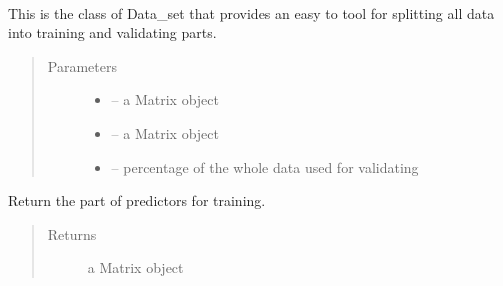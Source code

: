 \documentclass[letterpaper,10pt,english]{sphinxmanual}
\begin{document}
\begin{fulllineitems}
\label{\detokenize{index:dbm_py.interface.Data_set}}~

\begin{fulllineitems}
\label{\detokenize{index:dbm_py.interface.Data_set.__init__}}
This is the class of Data\_set that provides an easy to tool for splitting all data into training and validating
parts.
\begin{quote}\begin{description}
\item[{Parameters}] \leavevmode\begin{itemize}
\item {} 
 -- a Matrix object

\item {} 
 -- a Matrix object

\item {} 
 -- percentage of the whole data used for validating

\end{itemize}

\end{description}\end{quote}

\end{fulllineitems}


\begin{fulllineitems}
\label{\detokenize{index:dbm_py.interface.Data_set.get_train_x}}
Return the part of predictors for training.
\begin{quote}\begin{description}
\item[{Returns}] \leavevmode
a Matrix object

\end{description}\end{quote}

\end{fulllineitems}


\end{fulllineitems}
\end{document}
